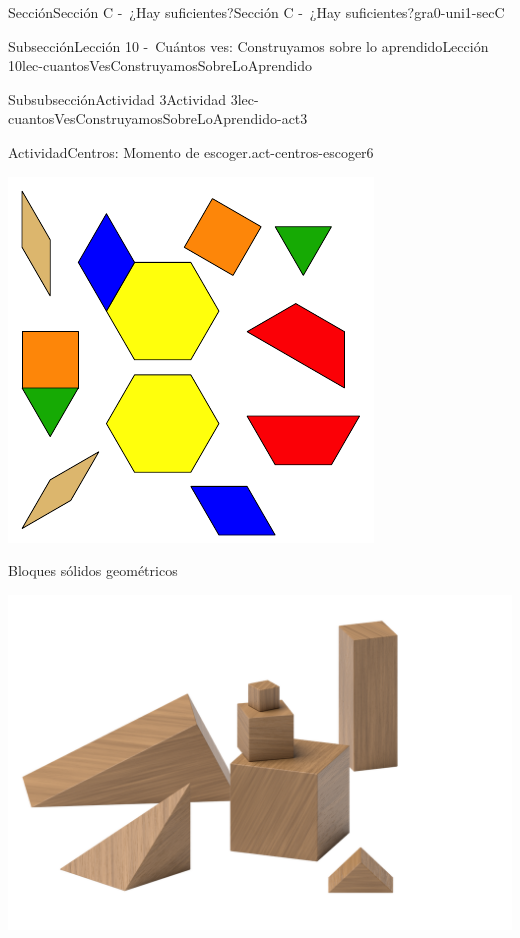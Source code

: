 \documentclass[twoside,10pt,]{article}
\begin{document}
\begin{sectionptx}{Sección}{Sección C -~¿Hay suficientes?}{}{Sección C -~¿Hay suficientes?}{}{}{gra0-uni1-secC}
\begin{subsectionptx}{Subsección}{Lección 10 -~Cuántos ves: Construyamos sobre lo aprendido}{}{Lección 10}{}{}{lec-cuantosVesConstruyamosSobreLoAprendido}
\begin{subsubsectionptx}{Subsubsección}{Actividad 3}{}{Actividad 3}{}{}{lec-cuantosVesConstruyamosSobreLoAprendido-act3}
\begin{activity}{Actividad}{Centros: Momento de escoger.}{act-centros-escoger6}
\begin{sidebyside}{2}{0.025}{0.025}{0.05}
\begin{sbspanel}{0.45}
\includegraphics[width=\linewidth]{external/svg-source/tikz-file-147344.pdf}
\end{sbspanel}%
\end{sidebyside}%
\begin{sidebyside}{2}{0.025}{0.025}{0.05}%
\begin{sbspanel}{0.45}%
Bloques sólidos geométricos%
\par
\includegraphics[width=\linewidth]{external/png-source/K.1.A Beta Student Workbook.Geoblocks.png}
\end{sbspanel}%

\end{sidebyside}
\end{activity}
\end{subsubsectionptx}
\end{subsectionptx}
\end{sectionptx}
\end{document}
